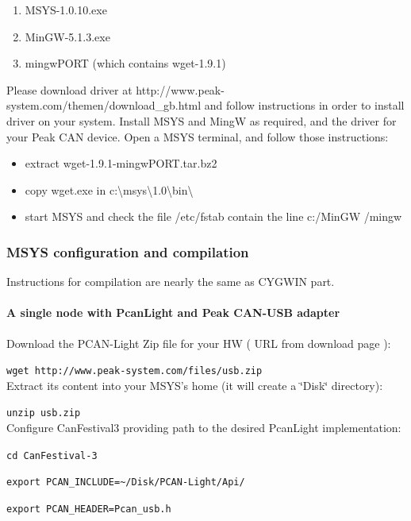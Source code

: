 \documentclass[a4paper,12pt]{book}
\begin{document}
\begin{enumerate}
\item MSYS-1.0.10.exe
\item MinGW-5.1.3.exe
\item mingwPORT (which contains wget-1.9.1)
\end{enumerate}
Please download driver at http://www.peak-system.com/themen/download\_gb.html
and follow instructions in order to install driver on your system.
Install MSYS and MingW as required, and the driver for your Peak CAN
device. Open a MSYS terminal, and follow those instructions:\\


\begin{itemize}
\item extract wget-1.9.1-mingwPORT.tar.bz2
\item copy wget.exe in c:\textbackslash{}msys\textbackslash{}1.0\textbackslash{}bin\textbackslash{}
\item start MSYS and check the file /etc/fstab contain the line c:/MinGW
/mingw
\end{itemize}

\subsubsection{MSYS configuration and compilation}

Instructions for compilation are nearly the same as CYGWIN part. 


\paragraph{A single node with PcanLight and Peak CAN-USB adapter}

Download the PCAN-Light Zip file for your HW ( URL from download page
):

\texttt{wget http://www.peak-system.com/files/usb.zip}~\\


Extract its content into your MSYS's home (it will create a \char`\"{}Disk\char`\"{}
directory):

\texttt{unzip usb.zip}~\\


Configure CanFestival3 providing path to the desired PcanLight implementation:

\texttt{cd CanFestival-3}

\texttt{export PCAN\_INCLUDE=\~{ }/Disk/PCAN-Light/Api/}

\texttt{export PCAN\_HEADER=Pcan\_usb.h}
\end{document}
